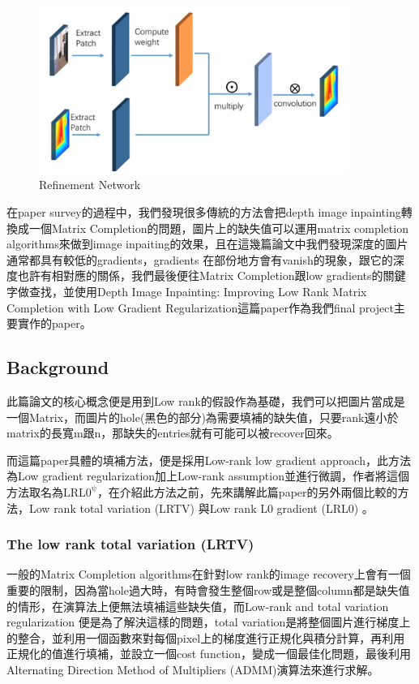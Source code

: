 \documentclass{article}
\begin{document}
\begin{CJK*}{UTF8}{bkai}
\begin{figure}[h]
\centering
\includegraphics[width=0.9\textwidth]{imgs/refinement.png}
\caption{Refinement Network}
\label{fig:refinement_network}
\end{figure}



在paper survey的過程中，我們發現很多傳統的方法會把depth image inpainting轉換成一個Matrix Completion的問題，圖片上的缺失值可以運用matrix completion algorithms來做到image inpaiting的效果，且在這幾篇論文中我們發現深度的圖片通常都具有較低的gradients，gradients 在部份地方會有vanish的現象，跟它的深度也許有相對應的關係，我們最後便往Matrix Completion跟low gradients的關鍵字做查找，並使用Depth Image Inpainting:
Improving Low Rank Matrix Completion with
Low Gradient Regularization\cite{lrl0phi}這篇paper作為我們final project主要實作的paper。


\subsection{Background}
此篇論文的核心概念便是用到Low rank的假設作為基礎，我們可以把圖片當成是一個Matrix，而圖片的hole(黑色的部分)為需要填補的缺失值，只要rank遠小於matrix的長寬m跟n，那缺失的entries就有可能可以被recover回來。



而這篇paper具體的填補方法，便是採用Low-rank low gradient approach，此方法為Low gradient regularization加上Low-rank assumption並進行微調，作者將這個方法取名為$\mathrm{LRL0^{\psi}}$，在介紹此方法之前，先來講解此篇paper的另外兩個比較的方法，Low rank total variation (LRTV) \cite{LRTV}與Low rank L0 gradient (LRL0) \cite{LRl0}。

\subsubsection{The low rank total variation (LRTV)}
一般的Matrix Completion algorithms在針對low rank的image recovery上會有一個重要的限制，因為當hole過大時，有時會發生整個row或是整個column都是缺失值的情形，在演算法上便無法填補這些缺失值，而Low-rank and total variation regularization 便是為了解決這樣的問題，total variation是將整個圖片進行梯度上的整合，並利用一個函數來對每個pixel上的梯度進行正規化與積分計算，再利用正規化的值進行填補，並設立一個cost function，變成一個最佳化問題，最後利用Alternating Direction Method of Multipliers (ADMM)演算法來進行求解。


\end{CJK*}
\end{document}
